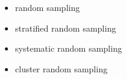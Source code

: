 \begin{itemize}
	\item random sampling
	\item stratified random sampling
	\item systematic random sampling
	\item cluster random sampling
\end{itemize}